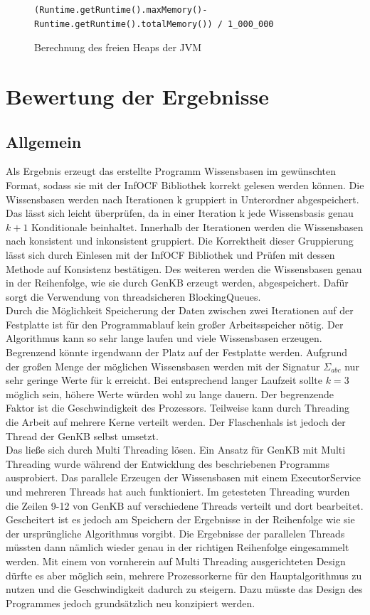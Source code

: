 \documentclass[12pt,a4paper]{article}
\begin{document}
\begin{figure}
\begin{lstlisting}
(Runtime.getRuntime().maxMemory()-Runtime.getRuntime().totalMemory()) / 1_000_000
\end{lstlisting}
\caption{Berechnung des freien Heaps der JVM}
\label{code:speicher}
\end{figure}


\section{Bewertung der Ergebnisse}
\subsection{Allgemein}


Als Ergebnis erzeugt das erstellte Programm Wissensbasen im gewünschten Format, sodass sie mit der InfOCF Bibliothek korrekt gelesen werden können. Die Wissensbasen werden nach Iterationen k gruppiert in Unterordner abgespeichert. Das lässt sich leicht überprüfen, da in einer Iteration k jede Wissensbasis genau $k+1$ Konditionale beinhaltet. Innerhalb der Iterationen werden die Wissensbasen nach konsistent und inkonsistent gruppiert. Die Korrektheit dieser Gruppierung lässt sich durch Einlesen mit der InfOCF Bibliothek und Prüfen mit dessen Methode auf Konsistenz bestätigen. Des weiteren werden die Wissensbasen genau in der Reihenfolge, wie sie durch GenKB erzeugt werden, abgespeichert. Dafür sorgt die Verwendung von threadsicheren BlockingQueues. \\
Durch die Möglichkeit Speicherung der Daten zwischen zwei Iterationen auf der Festplatte ist für den Programmablauf kein großer Arbeitsspeicher nötig. Der Algorithmus kann so sehr lange laufen und viele Wissensbasen erzeugen. Begrenzend könnte irgendwann der Platz auf der Festplatte werden. Aufgrund der großen Menge der möglichen Wissensbasen werden mit der Signatur $\Sigma_{abc}$ nur sehr geringe Werte für k erreicht. Bei entsprechend langer Laufzeit sollte $k=3$ möglich sein, höhere Werte würden wohl zu lange dauern. Der begrenzende Faktor ist die Geschwindigkeit des Prozessors. Teilweise kann durch Threading die Arbeit auf mehrere Kerne verteilt werden. Der Flaschenhals ist jedoch der Thread der GenKB selbst umsetzt.\\
Das ließe sich durch Multi Threading lösen. Ein Ansatz für GenKB mit Multi Threading wurde während der Entwicklung des beschriebenen Programms ausprobiert. Das parallele Erzeugen der Wissensbasen mit einem ExecutorService und mehreren Threads hat auch funktioniert. Im getesteten Threading wurden die Zeilen 9-12 von GenKB auf verschiedene Threads verteilt und dort bearbeitet. Gescheitert ist es jedoch am Speichern der Ergebnisse in der Reihenfolge wie sie der ursprüngliche Algorithmus vorgibt. Die Ergebnisse der parallelen Threads müssten dann nämlich wieder genau in der richtigen Reihenfolge eingesammelt werden. Mit einem von vornherein auf Multi Threading ausgerichteten Design dürfte es aber möglich sein, mehrere Prozessorkerne für den Hauptalgorithmus zu nutzen und die Geschwindigkeit dadurch zu steigern. Dazu müsste das Design des Programmes jedoch grundsätzlich neu konzipiert werden.
\end{document}
